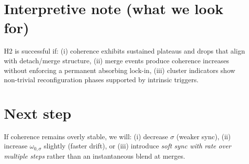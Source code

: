 \documentclass[11pt]{article}
\begin{document}
\section{Interpretive note (what we look for)}
H2 is successful if:
(i) coherence exhibits sustained plateaus and drops that align with detach/merge structure,
(ii) merge events produce coherence increases without enforcing a permanent absorbing lock-in,
(iii) cluster indicators show non-trivial reconfiguration phases supported by intrinsic triggers.

\section{Next step}
If coherence remains overly stable, we will:
(i) decrease $\sigma$ (weaker sync),
(ii) increase $\omega_{0,\sigma}$ slightly (faster drift),
or (iii) introduce \emph{soft sync with rate over multiple steps} rather than an instantaneous blend at merges.
\end{document}
